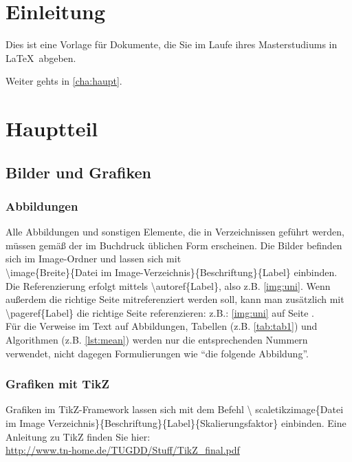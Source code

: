 \cleardoubleemptypage
{}
\setcounter{page}{1}
\chapter{Einleitung}\label{cha:ein}
Dies ist eine Vorlage für Dokumente, die Sie im Laufe ihres Masterstudiums in
\LaTeX ~abgeben.


Weiter gehts in \autoref{cha:haupt}.

\chapter{Hauptteil}\label{cha:haupt}

\section{Bilder und Grafiken}\label{sec:grafiken}
\subsection{Abbildungen}\label{subsec:bilder}
Alle Abbildungen und sonstigen Elemente, die in Verzeichnissen geführt werden,
müssen gemäß der im Buchdruck üblichen Form erscheinen. Die Bilder befinden sich
im Image-Ordner und lassen sich mit\\ \textbackslash image\{Breite\}\{Datei im
Image-Verzeichnis\}\{Beschriftung\}\{Label\} einbinden.
 Die Referenzierung erfolgt mittels
\textbackslash autoref\{Label\}, also z.B.
\autoref{img:uni}. Wenn au\ss erdem die richtige Seite mitreferenziert werden
soll, kann man zus\"atzlich mit \textbackslash pageref\{Label\} die richtige
Seite referenzieren: z.B.: \autoref{img:uni} auf Seite \pageref{img:uni}.\\
Für die Verweise im Text auf Abbildungen, Tabellen (z.B. \autoref{tab:tab1}) und
Algorithmen (z.B. \autoref{lst:mean}) werden nur die entsprechenden Nummern
verwendet, nicht dagegen Formulierungen wie ``die folgende Abbildung''.
\subsection{Grafiken mit TikZ}
Grafiken im TikZ-Framework lassen sich mit dem Befehl \textbackslash
scaletikzimage\{Datei im Image
Verzeichnis\}\{Beschriftung\}\{Label\}\{Skalierungsfaktor\} einbinden.
Eine Anleitung zu TikZ finden Sie hier:\\
\url{http://www.tn-home.de/TUGDD/Stuff/TikZ_final.pdf}

